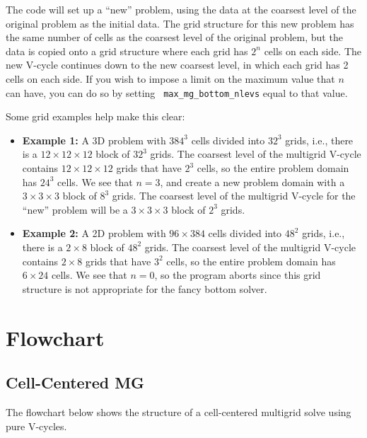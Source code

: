The code will set up a ``new'' problem, using the data at the
coarsest level of the original problem as the initial data.  The grid
structure for this new problem has the same number of cells as the
coarsest level of the original problem, but the data is copied onto a
grid structure where each grid has $2^n$ cells on each side.  The new
V-cycle continues down to the new coarsest level, in which each grid
has 2 cells on each side.  If you wish to impose a limit on the
maximum value that $n$ can have, you can do so by setting {\tt
max\_mg\_bottom\_nlevs} equal to that value.

Some grid examples help make this clear:
\begin{itemize}
\item {\bf Example 1:} A 3D problem with $384^3$ cells divided into $32^3$
grids, i.e., there is a $12\times 12\times 12$ block of $32^3$ grids.
The coarsest level of the multigrid V-cycle contains $12\times
12\times 12$ grids that have $2^3$ cells, so the entire problem domain
has $24^3$ cells.  We see that $n=3$, and create a new problem domain
with a $3\times 3\times 3$ block of $8^3$ grids.  The coarsest level
of the multigrid V-cycle for the ``new'' problem will be a $3\times
3\times 3$ block of $2^3$ grids.

\item {\bf Example 2:} A 2D problem with $96\times 384$ cells divided into
$48^2$ grids, i.e., there is a $2\times 8$ block of $48^2$ grids.  The
coarsest level of the multigrid V-cycle contains $2\times 8$ grids
that have $3^2$ cells, so the entire problem domain has $6\times 24$
cells.  We see that $n=0$, so the program aborts since this grid
structure is not appropriate for the fancy bottom solver.
\end{itemize}




\section{Flowchart}



\subsection{Cell-Centered MG}

The flowchart below shows the structure of a cell-centered multigrid
solve using pure V-cycles.


